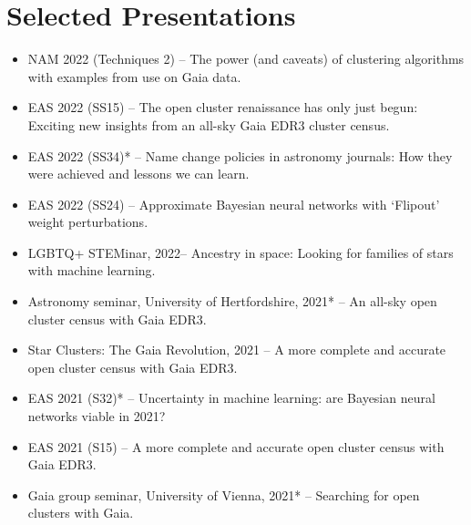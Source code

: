 \documentclass[12pt, letterpaper]{hunt-cv}
\begin{document}
\section*{Selected Presentations}

\begin{itemize}
    \item NAM 2022 (Techniques 2) -- The power (and caveats) of clustering algorithms with examples from use on Gaia data.
    \item EAS 2022 (SS15) -- The open cluster renaissance has only just begun: Exciting new insights from an all-sky Gaia EDR3 cluster census.
    \item EAS 2022 (SS34)* -- Name change policies in astronomy journals: How they were achieved and lessons we can learn. 
    \item EAS 2022 (SS24) -- Approximate Bayesian neural networks with `Flipout' weight perturbations.
    \item LGBTQ+ STEMinar, 2022\cross -- Ancestry in space: Looking for families of stars with machine learning.
    \item Astronomy seminar, University of Hertfordshire, 2021* -- An all-sky open cluster census with Gaia EDR3. 
    \item Star Clusters: The Gaia Revolution, 2021 -- A more complete and accurate open cluster census with Gaia EDR3.
    \item EAS 2021 (S32)* -- Uncertainty in machine learning: are Bayesian neural networks viable in 2021?
    \item EAS 2021 (S15) -- A more complete and accurate open cluster census with Gaia EDR3.
    \item Gaia group seminar, University of Vienna, 2021* -- Searching for open clusters with Gaia.
\end{itemize}
\end{document}
